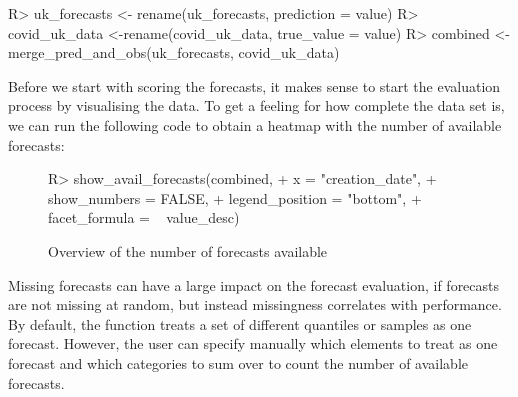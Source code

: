 \documentclass[article]{jss}
\begin{document}
% 
\begin{Schunk}
\begin{Sinput}
R> uk_forecasts <- rename(uk_forecasts, prediction = value)
R> covid_uk_data <-rename(covid_uk_data, true_value = value)
R> combined <- merge_pred_and_obs(uk_forecasts, covid_uk_data)
\end{Sinput}
\end{Schunk}
% 
Before we start with scoring the forecasts, it makes sense to start the evaluation process by visualising the data. To get a feeling for how complete the data set is, we can run the following code to obtain a heatmap with the number of available forecasts: 
% 
\begin{figure}[h]
\centering
\begin{Schunk}
\begin{Sinput}
R> show_avail_forecasts(combined, 
+                       x = "creation_date", 
+                       show_numbers = FALSE,
+                       legend_position = "bottom",
+                       facet_formula = ~ value_desc)
\end{Sinput}
\end{Schunk}
\caption{\label{fig:avail-forecasts} Overview of the number of forecasts available}
\end{figure}
% 
Missing forecasts can have a large impact on the forecast evaluation, if forecasts are not missing at random, but instead missingness correlates with performance. By default, the function treats a set of different quantiles or samples as one forecast. However, the user can specify manually which elements to treat as one forecast and which categories to sum over to count the number of available forecasts. 
\end{document}
